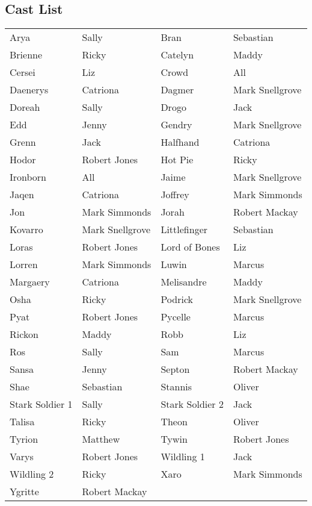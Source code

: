 \subsection*{Cast List}
\begin{tabular}{ll|ll}\\
Arya & Sally &  Bran & Sebastian\\
Brienne & Ricky &  Catelyn & Maddy\\
Cersei & Liz &  Crowd & All\\
Daenerys & Catriona &  Dagmer & Mark Snellgrove\\
Doreah & Sally &  Drogo & Jack\\
Edd & Jenny &  Gendry & Mark Snellgrove\\
Grenn & Jack &  Halfhand & Catriona\\
Hodor & Robert Jones &  Hot Pie & Ricky\\
Ironborn & All &  Jaime & Mark Snellgrove\\
Jaqen & Catriona &  Joffrey & Mark Simmonds\\
Jon & Mark Simmonds &  Jorah & Robert Mackay\\
Kovarro & Mark Snellgrove &  Littlefinger & Sebastian\\
Loras & Robert Jones &  Lord of Bones & Liz\\
Lorren & Mark Simmonds &  Luwin & Marcus\\
Margaery & Catriona &  Melisandre & Maddy\\
Osha & Ricky &  Podrick & Mark Snellgrove\\
Pyat & Robert Jones &  Pycelle & Marcus\\
Rickon & Maddy &  Robb & Liz\\
Ros & Sally &  Sam & Marcus\\
Sansa & Jenny &  Septon & Robert Mackay\\
Shae & Sebastian &  Stannis & Oliver\\
Stark Soldier 1 & Sally &  Stark Soldier 2 & Jack\\
Talisa & Ricky &  Theon & Oliver\\
Tyrion & Matthew &  Tywin & Robert Jones\\
Varys & Robert Jones &  Wildling 1 & Jack\\
Wildling 2 & Ricky &  Xaro & Mark Simmonds\\
Ygritte & Robert Mackay &  \end{tabular}
